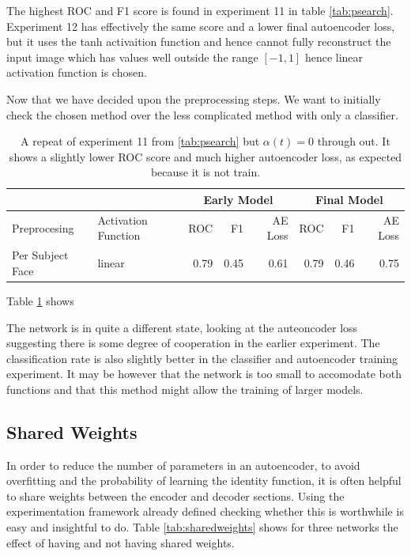 The highest ROC and F1 score is found in experiment 11 in table \ref{tab:psearch}. Experiment 12
has effectively the same score and a lower final autoencoder loss, but it uses the tanh activaition
function and hence cannot fully reconstruct the input image which has values well outside the
range $[-1,1]$ hence linear activation function is chosen.

Now that we have decided upon the preprocessing steps. We want to initially check
the chosen method over the less complicated method with only a classifier.

\begin{table}[!h] {\small
  \centering
\begin{tabular}{llrrrrrr}
  & &   \multicolumn{3}{|c|}{Early Model} &  \multicolumn{3}{c|}{Final Model}\\
\hline
   Preprocesing    & Activation Function&  ROC&F1&AE Loss & ROC & F1 & AE Loss \\
   \hline
 Per Subject Face   & linear &    0.79 &   0.45 &     0.61 &    0.79 &   0.46 &     0.75 \\
\hline
\end{tabular}\caption{A repeat of experiment 11 from \ref{tab:psearch} but $\alpha(t)=0$ through out.
It shows a slightly lower ROC score and much higher autoencoder loss, as expected because it is not train.}} \label{tab:psearchtest} \end{table}

Table \ref{tab:psearchtest} shows

The network is in quite a different state, looking at the auteoncoder loss
suggesting there is some degree of cooperation in the earlier experiment.
The classification rate is also slightly better in the classifier and autoencoder
training experiment. It may be however that the network is too small to accomodate both
functions and that this method might allow the training of larger models.
\newpage
%
%
%
%
%
\subsection{Shared Weights}
In order to reduce the number of parameters in an autoencoder, to avoid overfitting
and the probability of learning the identity function, it is often helpful to share weights
between the encoder and decoder sections. Using the experimentation framework already defined
checking whether this is worthwhile is easy and insightful to do. Table \ref{tab:sharedweights} shows
for three networks the effect of having and not having shared weights.

